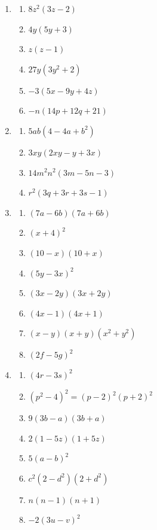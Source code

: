 \begin{enumerate}
    \item
          \begin{enumerate}
              \item \(8z^2(3z-2)\)
              \item \(4y(5y+3)\)
              \item \(z(z-1)\)
              \item \(27y(3y^2+2)\)
              \item \(-3(5x-9y+4z)\)
              \item \(-n(14p+12q+21)\)
          \end{enumerate}

    \item
          \begin{enumerate}
              \item \(5ab(4-4a+b^2)\)
              \item \(3xy(2xy-y+3x)\)
              \item \(14m^2n^2(3m-5n-3)\)
              \item \(r^2(3q+3r+3s-1)\)
          \end{enumerate}

    \item
          \begin{enumerate}
              \item \((7a-6b)(7a+6b)\)
              \item \((x+4)^2\)
              \item \((10-x)(10+x)\)
              \item \((5y-3x)^2\)
              \item \((3x-2y)(3x+2y)\)
              \item \((4x-1)(4x+1)\)
              \item \((x-y)(x+y)(x^2+y^2)\)
              \item \((2f-5g)^2\)
          \end{enumerate}

    \item
          \begin{enumerate}
              \item \((4r-3s)^2\)
              \item \((p^2-4)^2=(p-2)^2(p+2)^2\)
              \item \(9(3b-a)(3b+a)\)
              \item \(2(1-5z)(1+5z)\)
              \item \(5(a-b)^2\)
              \item \(c^2(2-d^2)(2+d^2)\)
              \item \(n(n-1)(n+1)\)
              \item \(-2(3u-v)^2\)
          \end{enumerate}


\end{enumerate}
